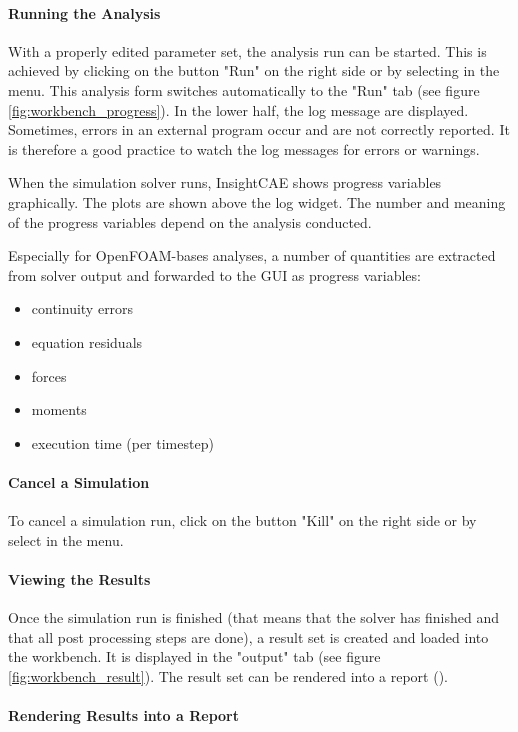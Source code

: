 \paragraph{Running the Analysis}
With a properly edited parameter set, the analysis run can be started.
This is achieved by clicking on the button "Run" on the right side or by selecting  in the menu.
This analysis form switches automatically to the "Run" tab (see figure \ref{fig:workbench_progress}).
In the lower half, the log message are displayed.
Sometimes, errors in an external program occur and are not correctly reported. 
It is therefore a good practice to watch the log messages for errors or warnings.

When the simulation solver runs, InsightCAE shows progress variables graphically.
The plots are shown above the log widget.
The number and meaning of the progress variables depend on the analysis conducted.

Especially for OpenFOAM-bases analyses, a number of quantities are extracted from solver output and forwarded to the GUI as progress variables:
\begin{itemize}
\item continuity errors
\item equation residuals
\item forces
\item moments
\item execution time (per timestep)
\end{itemize}

\paragraph{Cancel a Simulation}
To cancel a simulation run, click on the button "Kill" on the right side or by select  in the menu.

\paragraph{Viewing the Results}
Once the simulation run is finished (that means that the solver has finished and that all post processing steps are done), a result set is created and loaded into the workbench.
It is displayed in the "output" tab (see figure \ref{fig:workbench_result}).
The result set can be rendered into a report ().


\paragraph{Rendering Results into a Report}\label{par:workbench:create_report}


